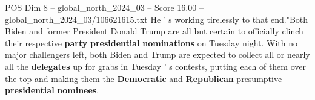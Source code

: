 \begin{textsample}{POS Dim 8 – global\_north\_2024\_03 – Score 16.00 – global\_north\_2024\_03/106621615.txt}
He ' s working tirelessly to that end."Both Biden and former President Donald Trump are all but certain to officially clinch their respective \textbf{party} \textbf{presidential} \textbf{nominations} on Tuesday night.
With no major challengers left, both Biden and Trump are expected to collect all or nearly all the \textbf{delegates} up for grabs in Tuesday ' s contests, putting each of them over the top and making them the \textbf{Democratic} and \textbf{Republican} presumptive \textbf{presidential} \textbf{nominees}.

\end{textsample}
